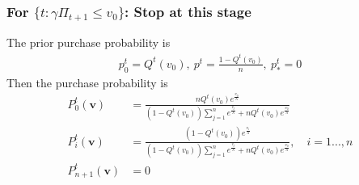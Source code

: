 \documentclass[11pt,a4paper]{article}
\begin{document}
\subsubsection*{For $\{t:\gamma\Pi_{t+1}\leq v_0\}$: Stop at this stage}
The prior purchase probability is
\begin{equation}
    \begin{aligned}
        p_0^t=Q^t(v_0),\  p^t=\frac{1-Q^t(v_0)}{n},\ p_*^t=0
    \end{aligned}
    \nonumber
\end{equation}
Then the purchase probability is
\begin{equation}
    \begin{aligned}
        P^t_0(\mathbf{v})&=\frac{nQ^t(v_0)e^{\frac{v_0}{\lambda}}}{(1-Q^t(v_0))\sum_{j=1}^{n}e^{\frac{v_j}{\lambda}}+nQ^t(v_0)e^{\frac{v_0}{\lambda}}}\\
        P^t_i(\mathbf{v})&=\frac{(1-Q^t(v_0))e^{\frac{v_i}{\lambda}}}{(1-Q^t(v_0))\sum_{j=1}^{n}e^{\frac{v_j}{\lambda}}+nQ^t(v_0)e^{\frac{v_0}{\lambda}}},\quad i=1...,n\\
        P^t_{n+1}(\mathbf{v})&=0
    \end{aligned}
    \nonumber
\end{equation}
\end{document}
